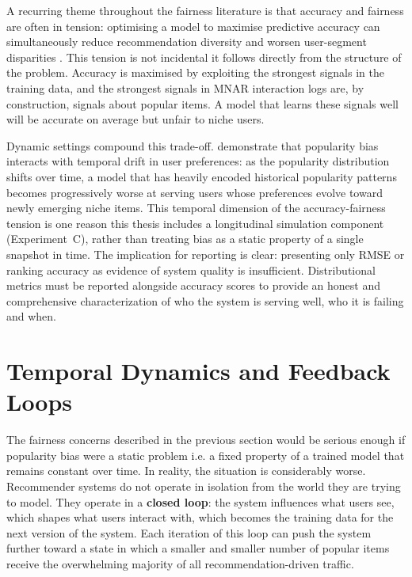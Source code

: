 \documentclass[11pt,a4paper]{report}
\begin{document}
A recurring theme throughout the fairness literature is that accuracy and fairness are often in tension: optimising a model to maximise predictive accuracy can simultaneously reduce recommendation diversity and worsen user-segment disparities \citep{jannach2015balances}. This tension is not incidental it follows directly from the structure of the problem. Accuracy is maximised by exploiting the strongest signals in the training data, and the strongest signals in MNAR interaction logs are, by construction, signals about popular items. A model that learns these signals well will be accurate on average but unfair to niche users.

Dynamic settings compound this trade-off. \citet{zhu2021dynamicpopularity} demonstrate that popularity bias interacts with temporal drift in user preferences: as the popularity distribution shifts over time, a model that has heavily encoded historical popularity patterns becomes progressively worse at serving users whose preferences evolve toward newly emerging niche items. This temporal dimension of the accuracy-fairness tension is one reason this thesis includes a longitudinal simulation component (Experiment~C), rather than treating bias as a static property of a single snapshot in time. The implication for reporting is clear: presenting only RMSE or ranking accuracy as evidence of system quality is insufficient. Distributional metrics must be reported alongside accuracy scores to provide an honest and comprehensive characterization of who the system is serving well, who it is failing and when.

\section{Temporal Dynamics and Feedback Loops}
\label{sec:lit_temporal}

The fairness concerns described in the previous section would be serious enough if popularity bias were a static problem i.e. a fixed property of a trained model that remains constant over time. In reality, the situation is considerably worse. Recommender systems do not operate in isolation from the world they are trying to model. They operate in a \textbf{closed loop}: the system influences what users see, which shapes what users interact with, which becomes the training data for the next version of the system. Each iteration of this loop can push the system further toward a state in which a smaller and smaller number of popular items receive the overwhelming majority of all recommendation-driven traffic.
\end{document}
